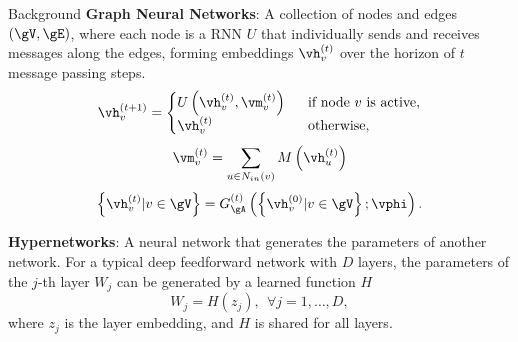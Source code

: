 \documentclass[final,t]{beamer}
\begin{document}
\begin{frame}{}
\begin{columns}[t]
\begin{column}{.47\linewidth}
    \begin{exampleblock}{Background}
	    \textbf{Graph Neural Networks}: 
	    A collection of nodes and edges $(\gV, \gE)$,
	    where each node is a RNN $U$ that individually sends and
		receives messages along the edges, 
		forming embeddings $\vh_v^{(t)}$ 
		over the horizon of $t$ message passing steps. 
				\begin{equation*}
			\vh_v^{(t+1)} = 
			\begin{cases}
			U \left(\vh_v^{(t)}, \vm_v^{(t)} \right) \ \ & \text{if node $v$ is active},\\
			\vh_v^{(t)} \ \ & \text{otherwise},
			\end{cases}
		\end{equation*}
		\begin{equation*}
			\vm_v^{(t)}=\sum_{u\in N_{in}(v)} M \left(\vh_u^{(t)} \right)
		\end{equation*}
	\begin{equation*}
	\left\{\vh_v^{(t)} | v \in \gV\right\} = 
	G_\gA^{(t)} \left(\left\{\vh_v^{(0)} | v \in \gV \right\}; \vphi \right).
	\end{equation*}

		\textbf{Hypernetworks}:
	  	A neural network that generates the parameters of
		another network. For a typical deep feedforward network with $D$ layers, 
		the parameters of the
		$j$-th layer $W_j$ can be generated by a learned function $H$
		\begin{equation*}
			W_j = H(z_j), \ \ \forall j = 1, \dots, D,
		\end{equation*}
		where $z_j$ is the layer embedding, and $H$ is shared for all layers.  	
    \end{exampleblock}    

%


\end{column}
\end{columns}
\end{frame}
\end{document}
